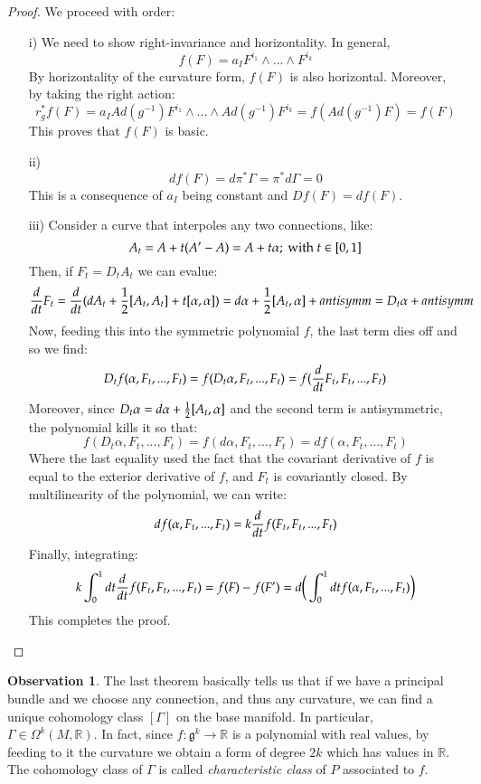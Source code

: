 \documentclass[12pt,a4paper]{report}
\theoremstyle{definition}
\theoremstyle{Theorem}
\theoremstyle{break}
\theoremstyle{definition}
\newtheorem{Obs}[Def]{Observation}
\begin{document}
		\begin{proof}
			We proceed with order:
			\begin{itemize}
				\item[i)] We need to show right-invariance and horizontality. In general, $$f(F)=a_IF^{i_1}\wedge ...\wedge F^{i_k}$$
				By horizontality of the curvature form, $f(F)$ is also horizontal. Moreover, by taking the right action:
				$$r_g^*f(F)=a_IAd(g^{-1})F^{i_1}\wedge ...\wedge Ad(g^{-1})F^{i_k}=f(Ad(g^{-1})F)=f(F)$$
				This proves that $f(F)$ is basic.
				\item[ii)]
				$$df(F)=d\pi^*\Gamma=\pi^*d\Gamma=0$$
				This is a consequence of $a_I$ being constant and $Df(F)=df(F)$.
				\item [iii)]
				Consider a curve that interpoles any two connections, like:
				$$A_t=A+t(A'-A)=A+t\alpha; \hbox{ with }t\in[0,1] $$
				Then, if $F_t=D_tA_t$ we can evalue:
				$${d\over dt} F_t={d\over dt}(dA_t+{1\over 2}[A_t,A_t]+t[\alpha,\alpha])=d\alpha+{1\over 2}[A_t,\alpha]+antisymm=D_t\alpha+antisymm$$
				Now, feeding this into the symmetric polynomial $f$, the last term dies off and so we find:
				$$D_tf(\alpha,F_t,...,F_t)=f(D_t\alpha,F_t,...,F_t)=f({d\over dt}F_t,F_t,...,F_t)$$
				Moreover, since $D_t\alpha=d\alpha+{1\over 2}[A_t,\alpha]$ and the second term is antisymmetric, the polynomial kills it so that:
				$$f(D_t\alpha,F_t,...,F_t)=f(d\alpha,F_t,...,F_t)=df(\alpha,F_t,...,F_t)$$
				Where the last equality used the fact that the covariant derivative of $f$ is equal to the exterior derivative of $f$, and $F_t$ is covariantly closed.
				By multilinearity of the polynomial, we can write:
				$$df(\alpha,F_t,...,F_t)=k{d\over dt}f(F_t,F_t,...,F_t)$$
				Finally, integrating:
				$$k\int_0^1 dt {d\over dt}f(F_t,F_t,...,F_t)=f(F)-f(F')=d\bigg(\int_0^1 dt f(\alpha,F_t,...,F_t)\bigg)$$
				This completes the proof.
			\end{itemize}
		\end{proof}
		\begin{Obs}
			The last theorem basically tells us that if we have a principal bundle and we choose any connection, and thus any curvature, we can find a unique cohomology class $[\Gamma]$ on the base manifold. In particular, $\Gamma\in\Omega^k(M,\mathbb{R})$. In fact, since $f:\mathfrak{g}^k\rightarrow \mathbb{R}$ is a polynomial with real values, by feeding to it the curvature we obtain a form of degree $2k$ which has values in $\mathbb{R}$. The cohomology class of $\Gamma$ is called \textit{characteristic class} of $P$ associated to $f$.
		\end{Obs}
\end{document}
